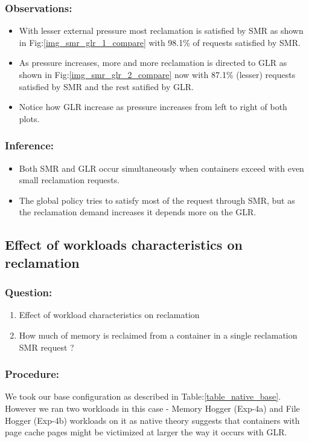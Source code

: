 	\subsubsection{Observations:}
	
	  \begin{itemize}
	    \item With lesser external pressure most reclamation is satisfied by SMR as shown in Fig:\ref{img_smr_glr_1_compare} with 
98.1\% of requests satisfied by SMR.
	    \item As pressure increases, more and more reclamation is directed to GLR as shown in Fig:\ref{img_smr_glr_2_compare} now 
	    with 87.1\% (lesser) requests satisfied by SMR and the rest satified by GLR.
	    \item Notice how GLR increase as pressure increases from left to right of both plots.
	  \end{itemize}

	\subsubsection{Inference:}
	  \begin{itemize}
	    \item Both SMR and GLR occur simultaneously when containers exceed with even small reclamation requests. 
	    \item The global policy tries to satisfy most of the request through SMR, but as the reclamation demand increases it 
depends more on  the GLR.
	  \end{itemize}
  
    \subsection{Effect of workloads characteristics on reclamation}
      
      \subsubsection{Question:} 
	  \begin{enumerate}
	    \item Effect of workload characteristics on reclamation
	    \item How much of memory is reclaimed from a container in a single reclamation SMR request ?
	  \end{enumerate}
	
	\subsubsection{Procedure:}
	  We took our base configuration as described in Table:\ref{table_native_base}. However we ran two workloads in this case - Memory 
Hogger (Exp-4a) and File Hogger (Exp-4b) workloads on it as native theory suggests that containers with page cache pages might be 
victimized at larger the way it occurs with GLR.	
	

